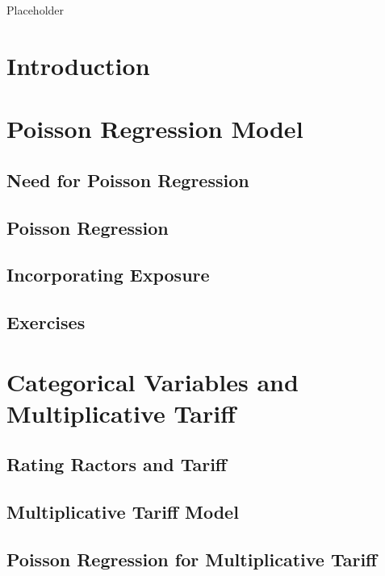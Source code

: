 \documentclass[]{book}
\theoremstyle{definition}
\theoremstyle{definition}
\theoremstyle{definition}
\theoremstyle{remark}
\begin{document}
Placeholder

\section{Introduction}\label{S:RC:Introduction}

\section{Poisson Regression Model}\label{S:RC:PoissonRegression}

\subsection{Need for Poisson Regression}\label{S:RC:Need.Poi.reg}

\subsection{Poisson Regression}\label{poisson-regression}

\subsection{Incorporating Exposure}\label{incorporating-exposure}

\subsection{Exercises}\label{exercises-2}

\section{Categorical Variables and Multiplicative
Tariff}\label{S:CatVarMultiTarriff}

\subsection{Rating Ractors and Tariff}\label{rating-ractors-and-tariff}

\subsection{Multiplicative Tariff
Model}\label{multiplicative-tariff-model}

\subsection{Poisson Regression for Multiplicative
Tariff}\label{poisson-regression-for-multiplicative-tariff}
\end{document}
